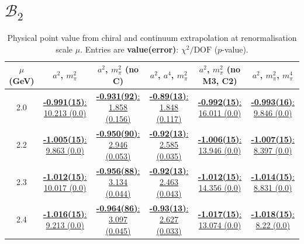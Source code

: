 \documentclass[12pt]{extarticle}
\begin{document}
\section{$\mathcal{B}_2$}
\begin{table}[h!]
\begin{center}
\begin{tabular}{|c|c|c|c|c|c|}
\hline
$\mu$ (GeV) & $a^2$, $m_\pi^2$& $a^2$, $m_\pi^2$ (no C)& $a^2$, $a^4$, $m_\pi^2$& $a^2$, $m_\pi^2$ (no M3, C2)& $a^2$, $m_\pi^2$, $m_\pi^4$\\
\hline
2.0& \hyperlink{VVmAA/NPR/a2m2_20.pdf.1}{\textbf{-0.991(15)}: 10.213 (0.0)} & \hyperlink{VVmAA/NPR/a2m2noC_20.pdf.1}{\textbf{-0.931(92)}: 1.858 (0.156)} & \hyperlink{VVmAA/NPR/a2a4m2_20.pdf.1}{\textbf{-0.89(13)}: 1.848 (0.117)} & \hyperlink{VVmAA/NPR/a2m2mcut_20.pdf.1}{\textbf{-0.992(15)}: 16.011 (0.0)} & \hyperlink{VVmAA/NPR/a2m2m4_20.pdf.1}{\textbf{-0.993(16)}: 9.846 (0.0)}\\
2.2& \hyperlink{VVmAA/NPR/a2m2_22.pdf.1}{\textbf{-1.005(15)}: 9.863 (0.0)} & \hyperlink{VVmAA/NPR/a2m2noC_22.pdf.1}{\textbf{-0.950(90)}: 2.946 (0.053)} & \hyperlink{VVmAA/NPR/a2a4m2_22.pdf.1}{\textbf{-0.92(13)}: 2.585 (0.035)} & \hyperlink{VVmAA/NPR/a2m2mcut_22.pdf.1}{\textbf{-1.006(15)}: 13.946 (0.0)} & \hyperlink{VVmAA/NPR/a2m2m4_22.pdf.1}{\textbf{-1.007(15)}: 8.397 (0.0)}\\
2.3& \hyperlink{VVmAA/NPR/a2m2_23.pdf.1}{\textbf{-1.012(15)}: 10.017 (0.0)} & \hyperlink{VVmAA/NPR/a2m2noC_23.pdf.1}{\textbf{-0.956(88)}: 3.134 (0.044)} & \hyperlink{VVmAA/NPR/a2a4m2_23.pdf.1}{\textbf{-0.92(13)}: 2.463 (0.043)} & \hyperlink{VVmAA/NPR/a2m2mcut_23.pdf.1}{\textbf{-1.012(15)}: 14.356 (0.0)} & \hyperlink{VVmAA/NPR/a2m2m4_23.pdf.1}{\textbf{-1.014(15)}: 8.831 (0.0)}\\
2.4& \hyperlink{VVmAA/NPR/a2m2_24.pdf.1}{\textbf{-1.016(15)}: 9.213 (0.0)} & \hyperlink{VVmAA/NPR/a2m2noC_24.pdf.1}{\textbf{-0.964(86)}: 3.097 (0.045)} & \hyperlink{VVmAA/NPR/a2a4m2_24.pdf.1}{\textbf{-0.93(13)}: 2.627 (0.033)} & \hyperlink{VVmAA/NPR/a2m2mcut_24.pdf.1}{\textbf{-1.017(15)}: 13.074 (0.0)} & \hyperlink{VVmAA/NPR/a2m2m4_24.pdf.1}{\textbf{-1.018(15)}: 8.22 (0.0)}\\
\hline
\end{tabular}
\caption{Physical point value from chiral and continuum extrapolation at renormalisation scale $\mu$. Entries are \textbf{value(error)}: $\chi^2/\text{DOF}$ ($p$-value).}
\end{center}
\end{table}
\end{document}

